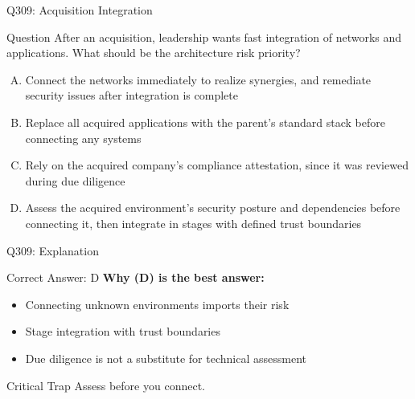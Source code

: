 \documentclass{beamer}
\begin{document}
	\begin{frame}{Q309: Acquisition Integration}
		\begin{block}{Question}
			\small After an acquisition, leadership wants fast integration of networks and applications. What should be the architecture risk priority?
		\end{block}
		\begin{enumerate}[(A)]
			\footnotesize
			\item Connect the networks immediately to realize synergies, and remediate security issues after integration is complete
			\item Replace all acquired applications with the parent's standard stack before connecting any systems
			\item Rely on the acquired company's compliance attestation, since it was reviewed during due diligence
			\item Assess the acquired environment's security posture and dependencies before connecting it, then integrate in stages with defined trust boundaries
		\end{enumerate}
	\end{frame}
	
	\begin{frame}{Q309: Explanation}
		\begin{block}{Correct Answer: D}
			\textbf{Why (D) is the best answer:}
			\begin{itemize}
				\item Connecting unknown environments imports their risk
				\item Stage integration with trust boundaries
				\item Due diligence is not a substitute for technical assessment
			\end{itemize}
		\end{block}
		\begin{alertblock}{Critical Trap}
			Assess before you connect.
		\end{alertblock}
	\end{frame}
	
\end{document}
